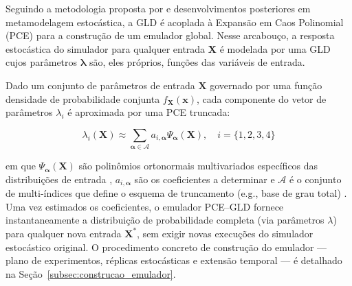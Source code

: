 Seguindo a metodologia proposta por \textcite{ZhuSudret2021} e desenvolvimentos posteriores em metamodelagem estocástica, a GLD é acoplada à Expansão em Caos Polinomial (PCE) para a construção de um emulador global. Nesse arcabouço, a resposta estocástica do simulador para qualquer entrada $\mathbf{X}$ é modelada por uma GLD cujos parâmetros $\boldsymbol{\lambda}$ são, eles próprios, funções das variáveis de entrada.

Dado um conjunto de parâmetros de entrada $\mathbf{X}$ governado por uma função densidade de probabilidade conjunta $f_{\mathbf{X}}(\mathbf{x})$, cada componente do vetor de parâmetros $\lambda_i$ é aproximada por uma PCE truncada:

\begin{equation}
\lambda_i(\mathbf{X}) \approx \sum_{\boldsymbol{\alpha} \in \mathcal{A}} a_{i, \boldsymbol{\alpha}} \Psi_{\boldsymbol{\alpha}}(\mathbf{X}), \quad i = \{1, 2, 3, 4\}
\label{eq:pce_lambda}
\end{equation}

\noindent em que $\Psi_{\boldsymbol{\alpha}}(\mathbf{X})$ são polinômios ortonormais multivariados específicos das distribuições de entrada \parencite{xiu2002}, $a_{i, \boldsymbol{\alpha}}$ são os coeficientes a determinar e $\mathcal{A}$ é o conjunto de multi-índices que define o esquema de truncamento (e.g., base de grau total) \parencite{blatman2011}. Uma vez estimados os coeficientes, o emulador PCE--GLD fornece instantaneamente a distribuição de probabilidade completa (via parâmetros $\lambda$) para qualquer nova entrada $\mathbf{X}^*$, sem exigir novas execuções do simulador estocástico original. O procedimento concreto de construção do emulador --- plano de experimentos, réplicas estocásticas e extensão temporal --- é detalhado na Seção~\ref{subsec:construcao_emulador}.
